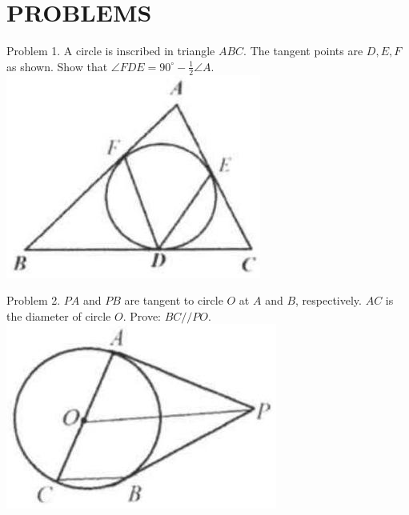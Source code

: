 \documentclass[10pt]{article}
\begin{document}
\section*{PROBLEMS}
Problem 1. A circle is inscribed in triangle \(A B C\). The tangent points are \(D, E, F\) as shown. Show that \(\angle F D E=90^{\circ}-\frac{1}{2} \angle A\).\\
\includegraphics[max width=\textwidth, center]{2025_04_17_97bc1f7e44d93c271a88g-169(2)}

Problem 2. \(P A\) and \(P B\) are tangent to circle \(O\) at \(A\) and \(B\), respectively. \(A C\) is the diameter of circle \(O\). Prove: \(B C / / P O\).\\
\includegraphics[max width=\textwidth, center]{2025_04_17_97bc1f7e44d93c271a88g-169(4)}
\end{document}
